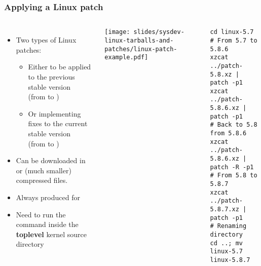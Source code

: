 \begin{frame}[fragile]
  \frametitle{Applying a Linux patch}
  \begin{columns}
     \begin{itemize}
     \item Two types of Linux patches:
           \begin{itemize}
	   \item Either to be applied to the previous stable version\\
	         (from  to )
	   \item Or implementing fixes to the current stable version\\
	      (from  to )
	   \end{itemize}
     \item Can be downloaded in  or  (much
       smaller) compressed files.
     \item Always produced for \\
     \item Need to run the  command inside the {\bf toplevel}
       kernel source directory
     \end{itemize}
    \texttt{[image: slides/sysdev-linux-tarballs-and-patches/linux-patch-example.pdf]}
     \footnotesize
     \begin{block}{}
     \begin{verbatim}
cd linux-5.7
# From 5.7 to 5.8.6
xzcat ../patch-5.8.xz | patch -p1
xzcat ../patch-5.8.6.xz | patch -p1
# Back to 5.8 from 5.8.6
xzcat ../patch-5.8.6.xz | patch -R -p1
# From 5.8 to 5.8.7
xzcat ../patch-5.8.7.xz | patch -p1
# Renaming directory
cd ..; mv linux-5.7 linux-5.8.7
    \end{verbatim}
    \end{block}
  \end{columns}
\end{frame}
